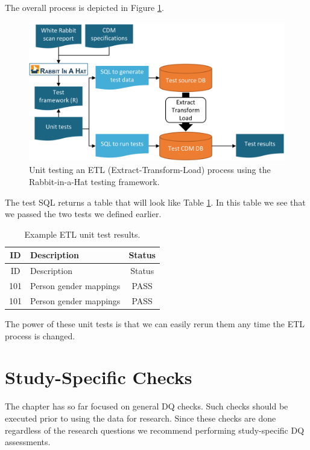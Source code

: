 \documentclass[11pt]{book}
\theoremstyle{definition}
\theoremstyle{definition}
\theoremstyle{definition}
\theoremstyle{remark}
\begin{document}
The overall process is depicted in Figure \ref{fig:testFramework}.

\begin{figure}

{\centering \includegraphics[width=0.9\linewidth]{images/DataQuality/testFramework} 

}

\caption{Unit testing an ETL (Extract-Transform-Load) process using the Rabbit-in-a-Hat testing framework.}\label{fig:testFramework}
\end{figure}

The test SQL returns a table that will look like Table
\ref{tab:exampleTestResults}. In this table we see that we passed the
two tests we defined earlier.

\begin{longtable}[]{@{}clc@{}}
\caption{\label{tab:exampleTestResults} Example ETL unit test
results.}\tabularnewline
\toprule
ID & Description & Status\tabularnewline
\midrule
\endfirsthead
\toprule
ID & Description & Status\tabularnewline
\midrule
\endhead
101 & Person gender mappings & PASS\tabularnewline
101 & Person gender mappings & PASS\tabularnewline
\bottomrule
\end{longtable}

The power of these unit tests is that we can easily rerun them any time
the ETL process is changed.

\section{Study-Specific Checks}\label{study-specific-checks}


The chapter has so far focused on general DQ checks. Such checks should
be executed prior to using the data for research. Since these checks are
done regardless of the research questions we recommend performing
study-specific DQ assessments.
\end{document}
